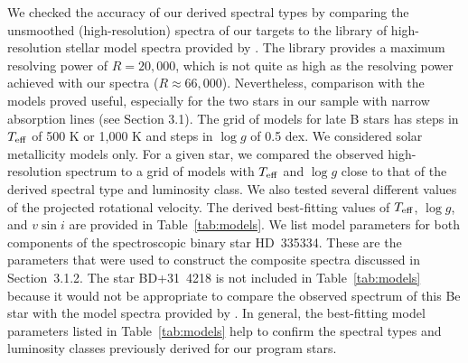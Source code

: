 \documentclass[fleqn,usenatbib]{mnras}
\begin{document}
We checked the accuracy of our derived spectral types by comparing the unsmoothed (high-resolution) spectra of our targets to the library of high-resolution stellar model spectra provided by \citet{m05}. The \citet{m05} library provides a maximum resolving power of $R=20,000$, which is not quite as high as the resolving power achieved with our spectra ($R\approx66,000$). Nevertheless, comparison with the \citet{m05} models proved useful, especially for the two stars in our sample with narrow absorption lines (see Section 3.1). The grid of \citet{m05} models for late B stars has steps in $T_{\rm eff}$ of 500 K or 1,000 K and steps in $\log g$ of 0.5 dex. We considered solar metallicity models only. For a given star, we compared the observed high-resolution spectrum to a grid of models with $T_{\rm eff}$ and $\log g$ close to that of the derived spectral type and luminosity class. We also tested several different values of the projected rotational velocity. The derived best-fitting values of $T_{\rm eff}$, $\log g$, and $v \sin i$ are provided in Table~\ref{tab:models}. We list model parameters for both components of the spectroscopic binary star HD~335334. These are the parameters that were used to construct the composite spectra discussed in Section~3.1.2. The star BD+31~4218 is not included in Table~\ref{tab:models} because it would not be appropriate to compare the observed spectrum of this Be star with the model spectra provided by \citet{m05}. In general, the best-fitting model parameters listed in Table~\ref{tab:models} help to confirm the spectral types and luminosity classes previously derived for our program stars.



\bsp	%
\label{lastpage}
\end{document}
